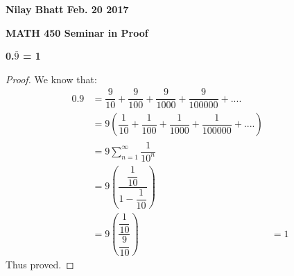 \documentclass[12pt, fullpage]{article}
\begin{document}
\begin{flushleft}
\textbf{Nilay Bhatt Feb. 20 2017}		
\end{flushleft}

\begin{center}
{\bf MATH 450 Seminar in Proof}
\end{center}

\begin{center}
\textbf{0.$\bar{9}$ = 1}
\end{center}

\begin{proof}
We know that:
\begin{align*}
0.9 &= \dfrac{9}{10} + \dfrac{9}{100} + \dfrac{9}{1000} + \dfrac{9}{100000} + ....\\
&= 9(\dfrac{1}{10} + \dfrac{1}{100} + \dfrac{1}{1000} + \dfrac{1}{100000} + ....)\\
&= 9 \sum_{n=1}^{\infty}\dfrac{1}{10^n} \\
&= 9 (\dfrac{\dfrac{1}{10}}{1-\dfrac{1}{10}})\\
&= 9 (\dfrac{\dfrac{1}{10}}{\dfrac{9}{10}})
&= 1
\end{align*}
Thus proved.

\end{proof}
\end{document}
